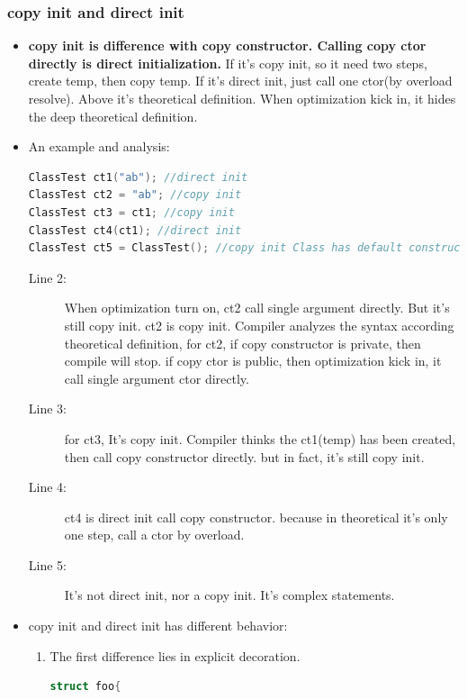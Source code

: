 \documentclass[a4paper,11pt,twoside]{book}
\begin{document}
\subsubsection{copy init and direct init}
\begin{itemize}

	\item \textbf{copy init is difference with copy constructor. Calling copy ctor directly is direct initialization.} If it's copy init, so it need two steps, create temp, then copy temp.  If it's direct init, just call one ctor(by overload resolve). Above it's theoretical definition. When optimization kick in, it hides the deep theoretical definition.
	
	\item An example and analysis:
\begin{lstlisting}[frame=single, language=c++]
ClassTest ct1("ab"); //direct init
ClassTest ct2 = "ab"; //copy init 
ClassTest ct3 = ct1; //copy init
ClassTest ct4(ct1); //direct init
ClassTest ct5 = ClassTest(); //copy init Class has default constructor
\end{lstlisting}
\begin{description}
	\item[Line 2:]  When optimization turn on, ct2 call single argument directly. But it's still copy init. ct2 is copy init. Compiler analyzes the syntax according theoretical definition, for ct2, if copy constructor is private, then compile will stop. if copy ctor is public, then optimization kick in, it call single argument ctor directly.
	
	\item[Line 3:] for ct3, It's copy init. Compiler thinks the ct1(temp) has been created, then call copy constructor directly. but in fact, it's still copy init.
	
	\item[Line 4:] ct4 is direct init call copy constructor. because in theoretical it's only one step, call a ctor by overload. 
	
	\item[Line 5:] It's not direct init, nor a copy init. It's complex statements.
	
\end{description}

	\item copy init and direct init has different behavior:
	\begin{enumerate}
		\item The first difference lies in explicit decoration.
\begin{lstlisting}[frame=single, language=c++]
struct foo{
 

\end{lstlisting}
\end{enumerate}
\end{itemize}
\end{document}

